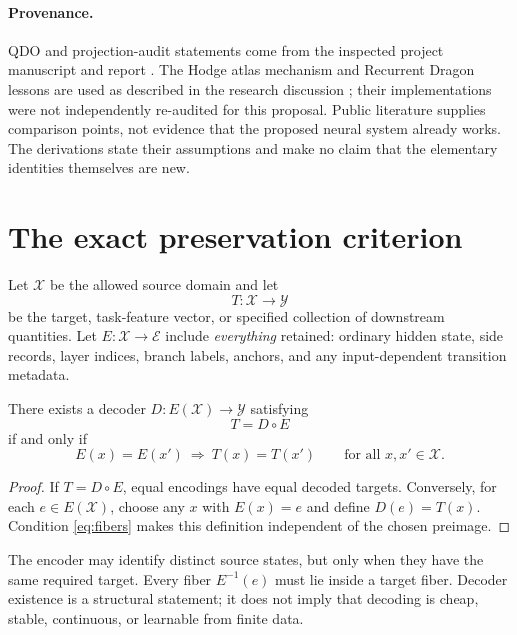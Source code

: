 \paragraph{Provenance.}
QDO and projection-audit statements come from the inspected project manuscript
and report \cite{qdo,projection}. The Hodge atlas mechanism and Recurrent Dragon
lessons are used as described in the research discussion \cite{discussion};
their implementations were not independently re-audited for this proposal.
Public literature supplies comparison points, not evidence that the proposed
neural system already works. The derivations state their assumptions and make
no claim that the elementary identities themselves are new.

\clearpage
\tableofcontents
\newpage

\section{The exact preservation criterion}
\label{sec:sufficiency}

Let \(\mathcal X\) be the allowed source domain and let
\[
 T:\mathcal X\to\mathcal Y
\]
be the target, task-feature vector, or specified collection of downstream
quantities. Let \(E:\mathcal X\to\mathcal E\) include \emph{everything} retained:
ordinary hidden state, side records, layer indices, branch labels, anchors, and
any input-dependent transition metadata.

\begin{theorem}
\label{thm:fibers}
There exists a decoder \(D:E(\mathcal X)\to\mathcal Y\) satisfying
\begin{equation}
 T=D\circ E
 \label{eq:factorization}
\end{equation}
if and only if
\begin{equation}
 E(x)=E(x')\ \Longrightarrow\ T(x)=T(x')
 \qquad\text{for all }x,x'\in\mathcal X.
 \label{eq:fibers}
\end{equation}
\end{theorem}
\begin{proof}
If \(T=D\circ E\), equal encodings have equal decoded targets. Conversely,
for each \(e\in E(\mathcal X)\), choose any \(x\) with \(E(x)=e\) and define
\(D(e)=T(x)\). Condition \eqref{eq:fibers} makes this definition independent
of the chosen preimage.
\end{proof}

The encoder may identify distinct source states, but only when they have the
same required target. Every fiber \(E^{-1}(e)\) must lie inside a target
fiber. Decoder existence is a structural statement; it does not imply that
decoding is cheap, stable, continuous, or learnable from finite data.

